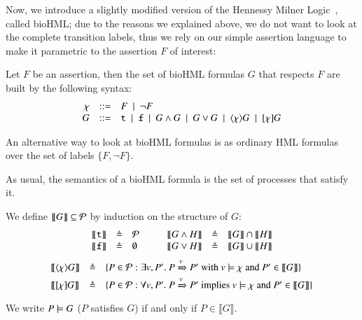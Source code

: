 Now, we introduce a slightly modified version of the Hennessy Milner Logic~\cite{HM80}, called bioHML; due to the reasons we explained above, we do not want to look at the complete transition labels, thus we rely on our simple assertion language to make it parametric to the assertion $F$ of interest:
\begin{definition}[bioHML]
Let   $F$ be an assertion, then 
the set of bioHML formulas $G$ that respects $F$ are built by the following syntax:
$$
\begin{array}{rcl}
\chi & ::= & F~\mid~ \neg F\\
G &::= &{\tt t} ~\mid~ {\tt f} ~\mid~ G\wedge G ~\mid~ G \vee G ~\mid~ \langle \chi \rangle G ~\mid~ [\chi]G
\end{array}
$$
\end{definition}

\begin{remark}
An alternative way to look at bioHML formulas is as ordinary HML formulas over the set of labels $\{F,\neg F\}$.
\end{remark}

As usual, the semantics of a bioHML formula is the set of processes that satisfy it.

\begin{definition}[semantics of $G$]
 We define $\llbracket G\rrbracket \subseteq {\cal P}$ by induction on the structure of $G$:
\[
\begin{array}{ccl@{\hspace{1cm}}ccl}
 \llbracket {\tt t}\rrbracket &\defeq& {\cal P} &  \llbracket G\wedge H\rrbracket &\defeq&  \llbracket G\rrbracket  \cap \llbracket H\rrbracket  \\
\llbracket {\tt f}\rrbracket& \defeq& \emptyset &
  \llbracket G\vee H\rrbracket &\defeq&  \llbracket G\rrbracket  \cup \llbracket H\rrbracket \\
\end{array}
\]
\[
\begin{array}{lcl}
 \llbracket  \langle \chi \rangle G \rrbracket &\triangleq& \{P \in {\cal P}: \exists v,P'.\ P\xRightarrow{v}P' \mbox{ with } v \models \chi \mbox{ and } P' \in  \llbracket  G \rrbracket\} \\
 \llbracket [\chi]G \rrbracket &\triangleq& \{P \in {\cal P}: \forall v,P'.\ P\xRightarrow{v}P' \mbox{ implies } v \models \chi \mbox{ and } P' \in  \llbracket  G \rrbracket\}
\end{array}
\]
We write $P \models G$ ($P$ satisfies $G$) if and only if $P \in  \llbracket G \rrbracket$.
\end{definition}

